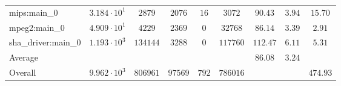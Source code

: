 \begin{tabular}{|l|c|c|c|c|c|c|c|c|}
mips:main\_0            & $ 3.184 \cdot 10^{1} $ & $ 2879   $ & $ 2076  $ & $ 16  $ & $ 3072   $ & $ 90.43       $ & $ 3.94    $ & $ 15.70   $ \\
mpeg2:main\_0           & $ 4.909 \cdot 10^{1} $ & $ 4229   $ & $ 2369  $ & $ 0   $ & $ 32768  $ & $ 86.14       $ & $ 3.39    $ & $ 2.91    $ \\
sha\_driver:main\_0     & $ 1.193 \cdot 10^{3} $ & $ 134144 $ & $ 3288  $ & $ 0   $ & $ 117760 $ & $ 112.47      $ & $ 6.11    $ & $ 5.31    $ \\
\hline
Average                 & $                    $ & $        $ & $       $ & $     $ & $        $ & $ 86.08       $ & $ 3.24    $ & $         $ \\
\hline
Overall                 & $ 9.962 \cdot 10^{3} $ & $ 806961 $ & $ 97569 $ & $ 792 $ & $ 786016 $ & $             $ & $         $ & $ 474.93  $ \\
\hline
\end{tabular}
